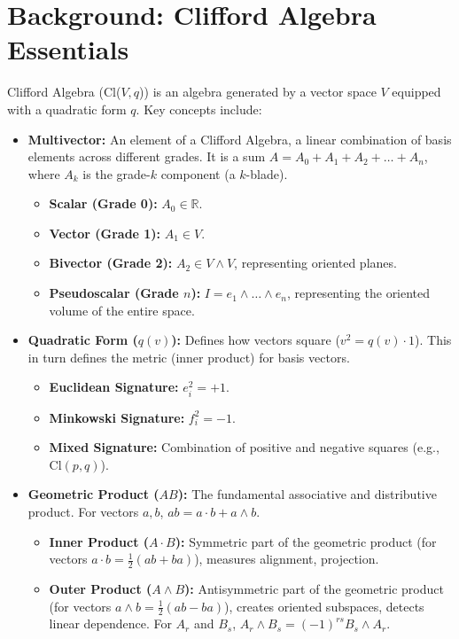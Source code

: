 \documentclass[11pt]{article}
\newcommand{\Cl}[2]{\text{Cl}(#1, #2)} %
\newcommand{\R}{\mathbb{R}}
\begin{document}
\section{Background: Clifford Algebra Essentials}
Clifford Algebra (Cl($V, q$)) is an algebra generated by a vector space $V$ equipped with a quadratic form $q$. Key concepts include:
\begin{itemize}[noitemsep]
    \item \textbf{Multivector:} An element of a Clifford Algebra, a linear combination of basis elements across different grades. It is a sum $A = A_0 + A_1 + A_2 + \dots + A_n$, where $A_k$ is the grade-$k$ component (a $k$-blade).
    \begin{itemize}[noitemsep]
        \item \textbf{Scalar (Grade 0):} $A_0 \in \R$.
        \item \textbf{Vector (Grade 1):} $A_1 \in V$.
        \item \textbf{Bivector (Grade 2):} $A_2 \in V \wedge V$, representing oriented planes.
        \item \textbf{Pseudoscalar (Grade $n$):} $I = e_1 \wedge \dots \wedge e_n$, representing the oriented volume of the entire space.
    \end{itemize}
    \item \textbf{Quadratic Form ($q(v)$):} Defines how vectors square ($v^2 = q(v) \cdot 1$). This in turn defines the metric (inner product) for basis vectors.
    \begin{itemize}[noitemsep]
        \item \textbf{Euclidean Signature:} $e_i^2 = +1$.
        \item \textbf{Minkowski Signature:} $f_i^2 = -1$.
        \item \textbf{Mixed Signature:} Combination of positive and negative squares (e.g., $\Cl{p}{q}$).
    \end{itemize}
    \item \textbf{Geometric Product ($AB$):} The fundamental associative and distributive product. For vectors $a,b$, $ab = a \cdot b + a \wedge b$.
    \begin{itemize}[noitemsep]
        \item \textbf{Inner Product ($A \cdot B$):} Symmetric part of the geometric product (for vectors $a \cdot b = \frac{1}{2}(ab+ba)$), measures alignment, projection.
        \item \textbf{Outer Product ($A \wedge B$):} Antisymmetric part of the geometric product (for vectors $a \wedge b = \frac{1}{2}(ab-ba)$), creates oriented subspaces, detects linear dependence. For $A_r$ and $B_s$, $A_r \wedge B_s = (-1)^{rs} B_s \wedge A_r$.

\end{itemize}
\end{itemize}
\end{document}
